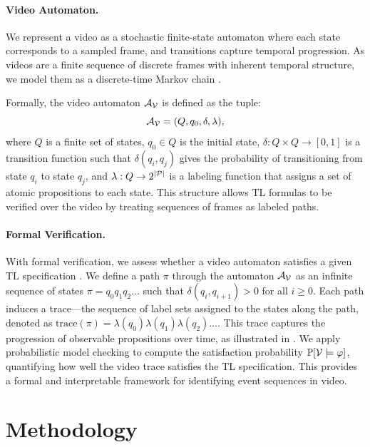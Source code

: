 \documentclass[letterpaper]{article} %
\begin{document}
    \paragraph{Video Automaton.}
    We represent a video as a stochastic finite-state automaton where each state corresponds to a sampled frame, and transitions capture temporal progression. As videos are a finite sequence of discrete frames with inherent temporal structure, we model them as a discrete-time Markov chain \citep{norris1998markov, kemeny1960finite}.
    
    Formally, the video automaton $\mathcal{A}_{\mathcal{V}}$ is defined as the tuple:
    \begin{equation}
        \mathcal{A}_{\mathcal{V}} = (Q, q_0, \delta, \lambda),
    \end{equation}
    where $Q$ is a finite set of states, $q_0 \in Q$ is the initial state, $\delta : Q \times Q \rightarrow [0,1]$ is a transition function such that $\delta(q_i, q_j)$ gives the probability of transitioning from state $q_i$ to state $q_j$, and $\lambda : Q \rightarrow 2^{|\mathcal{P}|}$ is a labeling function that assigns a set of atomic propositions to each state. This structure allows TL formulas to be verified over the video by treating sequences of frames as labeled paths.
    
    
    \paragraph{Formal Verification.}
    \label{sec:tl}
    With formal verification, we assess whether a video automaton satisfies a given TL specification \citep{clarke1999model, huth2004logic}. We define a path $\pi$ through the automaton $\mathcal{A}_{\mathcal{V}}$ as an infinite sequence of states $\pi = q_0 q_1 q_2 \dots$ such that $\delta(q_i, q_{i+1}) > 0$ for all $i \geq 0$. Each path induces a trace---the sequence of label sets assigned to the states along the path, denoted as $\text{trace}(\pi) = \lambda(q_0)\lambda(q_1)\lambda(q_2) \dots$. This trace captures the progression of observable propositions over time, as illustrated in . We apply probabilistic model checking \citep{Baier2008} to compute the satisfaction probability $\mathbb{P}[\mathcal{V} \models \varphi]$, quantifying how well the video trace satisfies the TL specification. This provides a formal and interpretable framework for identifying event sequences in video.


\section{Methodology}
\end{document}
